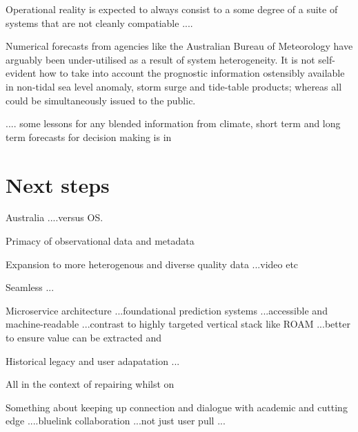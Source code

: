Operational reality is expected to always consist to a some degree of a suite of systems that are not cleanly compatiable ....

Numerical forecasts from agencies like the Australian Bureau of Meteorology have arguably been under-utilised as a result of system heterogeneity.   It is not self-evident how to take into account the prognostic information ostensibly available in non-tidal sea level anomaly, storm surge and tide-table products; whereas all could be simultaneously issued to the public. 

.... some lessons for any blended information from climate, short term and long term forecasts for decision making is in 

\section{Next steps}
Australia ....versus OS.

Primacy of observational data and metadata

Expansion to more heterogenous and diverse quality data ...video etc


Seamless ...

Microservice architecture 
...foundational prediction systems 
...accessible and machine-readable 
...contrast to highly targeted vertical stack like ROAM   ...better to ensure value can be extracted and 

Historical legacy and user adapatation ...

All in the context of repairing whilst on 

Something about keeping up connection and dialogue with academic and cutting edge ....bluelink collaboration ...not just user pull ...




